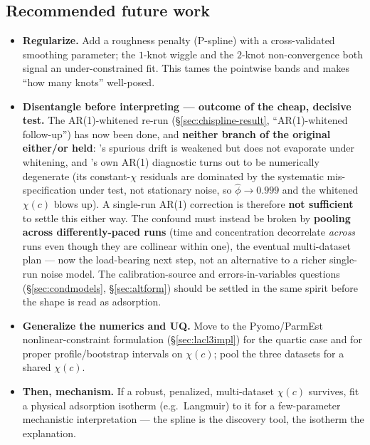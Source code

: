 \documentclass[11pt]{article}
\begin{document}
\subsection{Recommended future work}\label{sec:chispline-future}
\begin{itemize}[itemsep=2pt]
  \item \textbf{Regularize.} Add a roughness penalty (P-spline) with a
        cross-validated smoothing parameter; the $1$-knot wiggle and the
        $2$-knot non-convergence both signal an under-constrained fit. This
        tames the pointwise bands and makes ``how many knots'' well-posed.
  \item \textbf{Disentangle before interpreting --- outcome of the cheap,
        decisive test.} The AR(1)-whitened re-run
        (\S\ref{sec:chispline-result}, ``AR(1)-whitened follow-up'') has now
        been done, and \textbf{neither branch of the original either/or held}:
        's spurious drift is weakened but does not evaporate under
        whitening, and 's own AR(1) diagnostic turns out to be
        numerically degenerate (its constant-$\chi$ residuals are dominated
        by the systematic mis-specification under test, not stationary
        noise, so $\hat\phi\to0.999$ and the whitened $\chi(c)$ blows up).
        A single-run AR(1) correction is therefore \textbf{not sufficient} to
        settle this either way. The confound must instead be broken by
        \textbf{pooling across differently-paced runs} (time and concentration
        decorrelate \emph{across} runs even though they are collinear within
        one), the eventual multi-dataset plan --- now the load-bearing next
        step, not an alternative to a richer single-run noise model. The
        calibration-source and errors-in-variables questions
        (\S\ref{sec:condmodels}, \S\ref{sec:altform}) should be settled in the
        same spirit before the shape is read as adsorption.
  \item \textbf{Generalize the numerics and UQ.} Move to the Pyomo/ParmEst
        nonlinear-constraint formulation (\S\ref{sec:lacl3impl}) for the
        quartic  case and for proper profile/bootstrap intervals on
        $\chi(c)$; pool the three  datasets for a shared $\chi(c)$.
  \item \textbf{Then, mechanism.} If a robust, penalized, multi-dataset
        $\chi(c)$ survives, fit a physical adsorption isotherm (e.g.\ Langmuir)
        to it for a few-parameter mechanistic interpretation --- the spline is
        the discovery tool, the isotherm the explanation.
\end{itemize}
\end{document}

